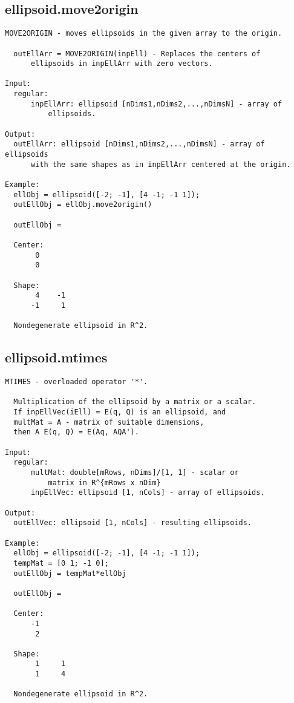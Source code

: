 \subsection{\texorpdfstring{ellipsoid.move2origin}{move2origin}}\label{method:ellipsoid.move2origin}
\begin{verbatim}
MOVE2ORIGIN - moves ellipsoids in the given array to the origin.

  outEllArr = MOVE2ORIGIN(inpEll) - Replaces the centers of
      ellipsoids in inpEllArr with zero vectors.

Input:
  regular:
      inpEllArr: ellipsoid [nDims1,nDims2,...,nDimsN] - array of
          ellipsoids.

Output:
  outEllArr: ellipsoid [nDims1,nDims2,...,nDimsN] - array of ellipsoids
      with the same shapes as in inpEllArr centered at the origin.

Example:
  ellObj = ellipsoid([-2; -1], [4 -1; -1 1]);
  outEllObj = ellObj.move2origin()

  outEllObj =

  Center:
       0
       0

  Shape:
       4    -1
      -1     1

  Nondegenerate ellipsoid in R^2.
\end{verbatim}
\subsection{\texorpdfstring{ellipsoid.mtimes}{mtimes}}\label{method:ellipsoid.mtimes}
\begin{verbatim}
MTIMES - overloaded operator '*'.

  Multiplication of the ellipsoid by a matrix or a scalar.
  If inpEllVec(iEll) = E(q, Q) is an ellipsoid, and
  multMat = A - matrix of suitable dimensions,
  then A E(q, Q) = E(Aq, AQA').

Input:
  regular:
      multMat: double[mRows, nDims]/[1, 1] - scalar or
          matrix in R^{mRows x nDim}
      inpEllVec: ellipsoid [1, nCols] - array of ellipsoids.

Output:
  outEllVec: ellipsoid [1, nCols] - resulting ellipsoids.

Example:
  ellObj = ellipsoid([-2; -1], [4 -1; -1 1]);
  tempMat = [0 1; -1 0];
  outEllObj = tempMat*ellObj

  outEllObj =

  Center:
      -1
       2

  Shape:
       1     1
       1     4

  Nondegenerate ellipsoid in R^2.
\end{verbatim}
